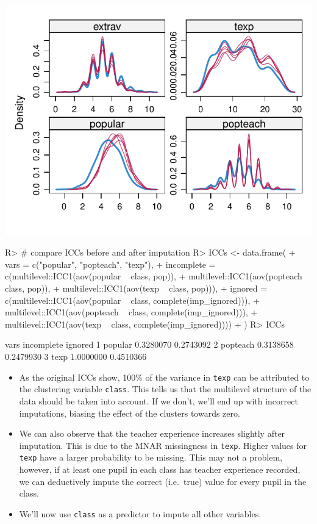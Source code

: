 \documentclass[
]{jss}
\begin{document}
\begin{CodeChunk}
\begin{center}\includegraphics{Manuscript_files/figure-latex/pop-ignored-3} \end{center}

\begin{CodeInput}
R> # compare ICCs before and after imputation
R> ICCs <- data.frame(
+   vars = c("popular", "popteach", "texp"), 
+   incomplete = c(multilevel::ICC1(aov(popular ~ class, pop)), 
+                multilevel::ICC1(aov(popteach ~ class, pop)),
+                multilevel::ICC1(aov(texp ~ class, pop))), 
+   ignored = c(multilevel::ICC1(aov(popular ~ class, complete(imp_ignored))), 
+               multilevel::ICC1(aov(popteach ~ class, complete(imp_ignored))), 
+               multilevel::ICC1(aov(texp ~ class, complete(imp_ignored))))
+   )
R> ICCs
\end{CodeInput}
\begin{CodeOutput}
      vars incomplete   ignored
1  popular  0.3280070 0.2743092
2 popteach  0.3138658 0.2479930
3     texp  1.0000000 0.4510366
\end{CodeOutput}
\end{CodeChunk}

\begin{itemize}
\item
  As the original ICCs show, 100\% of the variance in \texttt{texp} can
  be attributed to the clustering variable \texttt{class}. This tells us
  that the multilevel structure of the data should be taken into
  account. If we don't, we'll end up with incorrect imputations, biasing
  the effect of the clusters towards zero.
\item
  We can also observe that the teacher experience increases slightly
  after imputation. This is due to the MNAR missingness in
  \texttt{texp}. Higher values for \texttt{texp} have a larger
  probability to be missing. This may not a problem, however, if at
  least one pupil in each class has teacher experience recorded, we can
  deductively impute the correct (i.e.~true) value for every pupil in
  the class.
\item
  We'll now use \texttt{class} as a predictor to impute all other
  variables.
\end{itemize}
\end{document}
